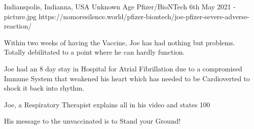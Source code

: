 {Indianspolis, Indianna, USA}
{Unknown Age}
{Pfizer/BioNTech}
{6th May 2021}
{-}
{picture.jpg}
{https://nomoresilence.world/pfizer-biontech/joe-pfizer-severe-adverse-reaction/}
{


Within two weeks of having the Vaccine, Joe has had nothing but problems. Totally debilitated to a point where he can hardly function.

Joe had an 8 day stay in Hospital for Atrial Fibrillation due to a compromised Immune System that weakened his heart which has needed to be Cardioverted to shock it back into rhythm.

Joe, a Respiratory Therapist explains all in his video and states 100%

His message to the unvaccinated is to Stand your Ground!
}
